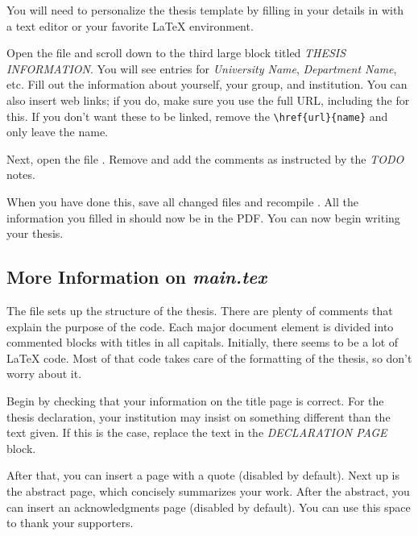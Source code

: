 You will need to personalize the thesis template by filling in your details in  with a text editor or your favorite LaTeX environment.

Open the file and scroll down to the third large block titled \emph{THESIS INFORMATION}. You will see entries for \emph{University Name}, \emph{Department Name}, etc. Fill out the information about yourself, your group, and institution.%
You can also insert web links; if you do, make sure you use the full URL, including the  for this. If you don't want these to be linked, remove the \verb|\href{url}{name}| and only leave the name.

Next, open the file . Remove and add the comments as instructed by the \emph{TODO} notes.

When you have done this, save all changed files and recompile . All the information you filled in should now be in the PDF. You can now begin writing your thesis.


\subsection{More Information on \emph{main.tex}}

The  file sets up the structure of the thesis. There are plenty of comments that explain the purpose of the code.
Each major document element is divided into commented blocks with titles in all capitals. Initially, there seems to be a lot of LaTeX code. Most of that code takes care of the formatting of the thesis, so don't worry about it.

Begin by checking that your information on the title page is correct. For the thesis declaration, your institution may insist on something different than the text given. If this is the case, replace the text in the \emph{DECLARATION PAGE} block.

After that, you can insert a page with a quote (disabled by default).
Next up is the abstract page, which concisely summarizes your work.
After the abstract, you can insert an acknowledgments page (disabled by default).
You can use this space to thank your supporters.

